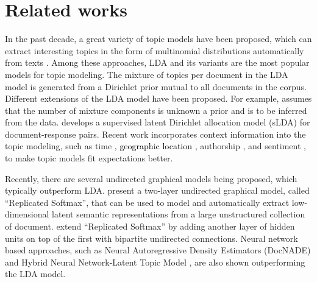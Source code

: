 \documentclass[english,letter]{article}
\renewcommand\[{\begin{equation}}
\renewcommand\]{\end{equation}}
\begin{document}
\section{Related works}

In the past decade, a great variety of topic models have been proposed,
which can extract interesting topics in the form of multinomial distributions
automatically from texts \cite{blei2003latent,griffiths2004hierarchical,blei2012probabilistic,gruber2007hidden,hinton2009replicated}.
Among these approaches, LDA \cite{blei2003latent} and its variants
are the most popular models for topic modeling. The mixture of topics
per document in the LDA model is generated from a Dirichlet prior
mutual to all documents in the corpus. Different extensions of the
LDA model have been proposed. For example, \citeauthor{teh2006hierarchical} 
assumes that the number of mixture components is unknown a prior and
is to be inferred from the data. \citeauthor{mcauliffe2008supervised} 
develops a supervised latent Dirichlet allocation model (sLDA) for
document-response pairs. Recent work incorporates context information
into the topic modeling, such as time \cite{wang2006topics}, \textcolor{black}{geographic
location \cite{mei2006probabilistic},} authorship \cite{steyvers2004probabilistic},
and sentiment \cite{yang2014learning,yang2014topic}, to make topic
models fit expectations better.

Recently, there are several undirected graphical models being proposed,
which typically outperform LDA. \citeauthor{mcauliffe2008supervised} 
present a two-layer undirected graphical model, called ``Replicated
Softmax'', that can be used to model and automatically extract low-dimensional
latent semantic representations from a large unstructured collection
of document. \citeauthor{hinton2009replicated} 
extend ``Replicated Softmax'' by adding another layer of hidden
units on top of the first with bipartite undirected connections. Neural
network based approaches, such as Neural Autoregressive Density Estimators
(DocNADE) \cite{larochelle2012neural} and Hybrid Neural Network-Latent
Topic Model \cite{wan2012hybrid}, are also shown outperforming the
LDA model.
\end{document}
